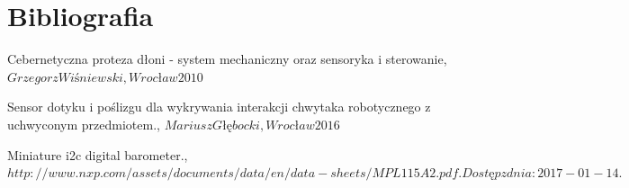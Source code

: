 \documentclass[a4paper,12pt]{article}
\begin{document}
	\section{Bibliografia}
\begin{thebibliography}{99}

 Cebernetyczna proteza dłoni - system mechaniczny oraz sensoryka i sterowanie,
\textit {$Grzegorz Wiśniewski, Wrocław 2010$}

 Sensor dotyku i poślizgu dla wykrywania interakcji chwytaka robotycznego z uchwyconym przedmiotem.,
\textit {$Mariusz Głębocki, Wrocław 2016$}

 Miniature i2c digital barometer.,
\textit {$http://www.nxp.com/assets/documents/data/en/data-sheets/MPL115A2.pdf. Dostęp z dnia: 2017-01-14.$}






\end{thebibliography}
	
	
\end{document}
